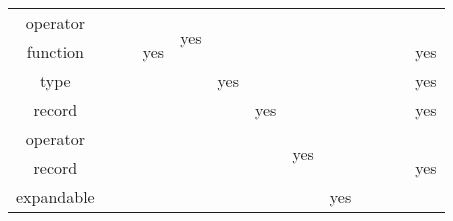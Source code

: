 \begin{table}[H]
{\begin{tabular}{|c|c|c|c|c|c|c|c|c|c|c|c|c|}
    \hline
    operator          &                          &                           & \cellcolor{lightgray}                      & \multirow{2}{*}{yes} &                          &                          &                          &                          &                            &                          &                        & \cellcolor{lightgray}                      \\
    function          &                          &                           & \multirow{-2}{*}{\cellcolor{lightgray}yes} &                      &                          &                          &                          &                          &                            &                          &                        & \multirow{-2}{*}{\cellcolor{lightgray}yes}  \\
    \hline
    type              &                          &                           &                                            &                      & yes                      &                          &                          &                          &                            &                          &                        & \cellcolor{lightgray}yes                   \\
    \hline
    record            &                          &                           &                                            &                      &                          & yes                      &                          &                          &                            &                          &                        & \cellcolor{lightgray}yes                   \\
    \hline
    operator          &                          &                           &                                            &                      &                          &                          & \multirow{2}{*}{yes}     &                          &                            &                          &                        & \cellcolor{lightgray}                      \\
    record            &                          &                           &                                            &                      &                          &                          &                          &                          &                            &                          &                        & \multirow{-2}{*}{\cellcolor{lightgray}yes} \\
    \hline
    expandable        &                          &                           &                                            &                      &                          &                          &                          & \multirow{2}{*}{yes}     &                            &                          &                        & \cellcolor{lightgray}                      \\

\end{tabular}}
\end{table}
